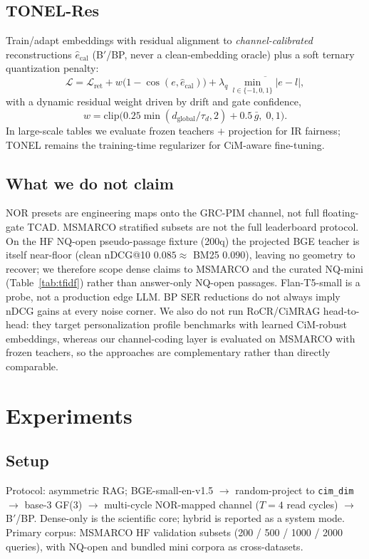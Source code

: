 \documentclass[sigconf,review,anonymous]{acmart}
\begin{document}
\subsection{TONEL-Res}
Train/adapt embeddings with residual alignment to \emph{channel-calibrated} reconstructions $\hat e_{\mathrm{cal}}$ (B$'$/BP, never a clean-embedding oracle) plus a soft ternary quantization penalty:
\begin{equation}
\mathcal{L}=\mathcal{L}_{\mathrm{ret}} + w\big(1-\cos(e,\hat e_{\mathrm{cal}})\big) + \lambda_q\,\overline{\min_{l\in\{-1,0,1\}}\lvert e-l\rvert},
\end{equation}
with a dynamic residual weight driven by drift and gate confidence,
\begin{equation}
w=\mathrm{clip}\big(0.25\min(d_{\mathrm{global}}/\tau_d,2)+0.5\,\bar g,\;0,1\big).
\end{equation}
In large-scale tables we evaluate frozen teachers $+$ projection for IR fairness; TONEL remains the training-time regularizer for CiM-aware fine-tuning.

\subsection{What we do not claim}
NOR presets are engineering maps onto the GRC-PIM channel, not full floating-gate TCAD.
MSMARCO stratified subsets are not the full leaderboard protocol.
On the HF NQ-open pseudo-passage fixture (200q) the projected BGE teacher is itself near-floor (clean nDCG@10 $0.085\approx$ BM25 $0.090$), leaving no geometry to recover; we therefore scope dense claims to MSMARCO and the curated NQ-mini (Table~\ref{tab:tfidf}) rather than answer-only NQ-open passages.
Flan-T5-small is a probe, not a production edge LLM.
BP SER reductions do not always imply nDCG gains at every noise corner.
We also do not run RoCR/CiMRAG head-to-head: they target personalization profile benchmarks with learned CiM-robust embeddings, whereas our channel-coding layer is evaluated on MSMARCO with frozen teachers, so the approaches are complementary rather than directly comparable.

\section{Experiments}

\subsection{Setup}
Protocol: asymmetric RAG; BGE-small-en-v1.5 $\rightarrow$ random-project to \texttt{cim\_dim} $\rightarrow$ base-3 GF(3) $\rightarrow$ multi-cycle NOR-mapped channel ($T{=}4$ read cycles) $\rightarrow$ B$'$/BP.
Dense-only is the scientific core; hybrid is reported as a system mode.
Primary corpus: MSMARCO HF validation subsets (200 / 500 / 1000 / 2000 queries), with NQ-open and bundled mini corpora as cross-datasets.
\end{document}
